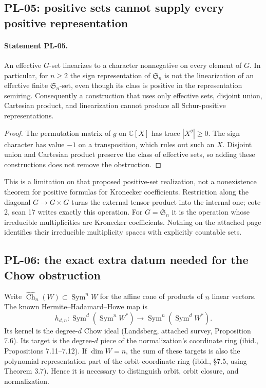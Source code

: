 \subsection{PL-05: positive sets cannot supply every positive representation}
\paragraph{Statement PL-05.}
An effective $G$-set linearizes to a character nonnegative on every element
of $G$. In particular, for $n\geq2$ the sign representation of $\mathfrak S_n$
is not the linearization of an effective finite $\mathfrak S_n$-set, even
though its class is positive in the representation semiring. Consequently a
construction that uses only effective sets, disjoint union, Cartesian product,
and linearization cannot produce all Schur-positive representations.

\begin{proof}
The permutation matrix of $g$ on $\mathbb C[X]$ has trace $|X^g|\geq0$.
The sign character has value $-1$ on a transposition, which rules out such
an $X$. Disjoint union and Cartesian product preserve the class of effective
sets, so adding these constructions does not remove the obstruction.
\end{proof}

This is a limitation on that proposed positive-set realization, not a
nonexistence theorem for positive formulas for Kronecker coefficients.
Restriction along the diagonal $G\to G\times G$ turns the external tensor
product into the internal one; cote 2, scan 17 writes exactly this operation.
For $G=\mathfrak S_n$ it is the operation whose irreducible multiplicities
are Kronecker coefficients. Nothing on the attached page identifies their
irreducible multiplicity spaces with explicitly countable sets.

\subsection{PL-06: the exact extra datum needed for the Chow obstruction}
Write $\widehat{\operatorname{Ch}}_n(W)\subset\operatorname{Sym}^nW$ for
the affine cone of products of $n$ linear vectors. The known
Hermite--Hadamard--Howe map is
\[
 h_{d,n}:\operatorname{Sym}^d(\operatorname{Sym}^nW^*)
       \longrightarrow\operatorname{Sym}^n(\operatorname{Sym}^dW^*).
\]
Its kernel is the degree-$d$ Chow ideal (Landsberg, attached survey,
Proposition 7.6). Its target is the degree-$d$ piece of the normalization's
coordinate ring (ibid., Propositions 7.11--7.12). If $\dim W=n$, the sum
of these targets is also the polynomial-representation part of the orbit
coordinate ring (ibid., \S7.5, using Theorem 3.7). Hence it is necessary
to distinguish orbit, orbit closure, and normalization.

